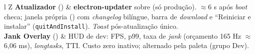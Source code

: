 \begin{table}[h]
\begin{tabularx}{\linewidth}{l Z}
\textbf{Atualizador} () & \textbf{electron-updater} sobre  (só produção). $\approx$6 s após \textit{boot} checa; janela própria () com \textit{changelog} bilíngue, barra de \textit{download} e \enquote{Reiniciar e instalar} (\lstinline|quitAndInstall|). \textit{Toast} pós-atualização único. \\
\textbf{Jank Overlay} () & HUD de dev: FPS, p99, taxa de \textit{jank} (orçamento 165 Hz $\approx$6,06 ms), \textit{longtasks}, TTI. Custo zero inativo; alternado pela paleta (grupo Dev). \\
\bottomrule
\end{tabularx}
\end{table}
